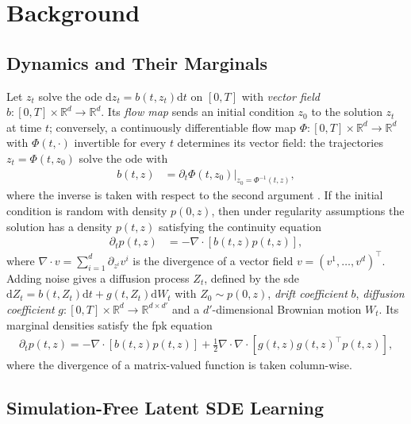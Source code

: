 \documentclass{article} %
\newcommand{\drift}{b}
\newcommand{\vol}{g}
\newcommand{\diff}{{\mathrm{d}}}
\newcommand{\reals}{\mathbb{R}}
\begin{document}
\section{Background}

\subsection{Dynamics and Their Marginals}
Let $z_t$ solve the \gls{ode} $\diff z_t = \drift(t,z_t) \diff t$ on $[0, T]$ with \emph{vector field} $\drift : [0,T] \times \reals^d \to \reals^d$. Its \emph{flow map} sends an initial condition $z_0$ to the solution $z_t$ at time $t$; conversely, a continuously differentiable flow map $\Phi : [0,T] \times \reals^d \to \reals^d$ with $\Phi(t, \cdot)$ invertible for every $t$ determines its vector field: the trajectories $z_t = \Phi(t, z_0)$ solve the \gls{ode} with
\begin{align}
    \drift(t, z) &= \partial_t \Phi(t, z_0) \big|_{z_0 = \Phi^{-1}(t, z)},
    \label{eq:flowvectorfield}
\end{align}
where the inverse is taken with respect to the second argument \citep[Fundamental Theorem on Time-Dependent Flows, Theorem 9.48]{lee2012smooth}. If the initial condition is random with density $p(0, z)$, then under regularity assumptions the solution has a density $p(t, z)$ satisfying the continuity equation
\begin{align}
    \partial_t p(t, z) &= -\nabla \cdot [\drift(t,z) p(t, z)],
    \label{eq:continuity}
\end{align}
where $\nabla \cdot v = \sum_{i=1}^d \partial_{z^i} v^i$ is the divergence of a vector field $v = (v^1, \ldots, v^d)^\top$. Adding noise gives a diffusion process $Z_t$, defined by the \gls{sde} $\diff Z_t = \drift(t,Z_t) \diff t + \vol(t,Z_t)\diff W_t$ with $Z_0 \sim p(0, z)$, \emph{drift coefficient} $\drift$, \emph{diffusion coefficient} $\vol : [0,T] \times \reals^d \to \reals^{d\times d'}$ and a $d'$-dimensional Brownian motion $W_t$. Its marginal densities satisfy the \gls{fpk} equation
\begin{align}
    \partial_t p(t, z) = -\nabla \cdot [\drift(t,z) p(t, z) ] + \frac{1}{2} \nabla \cdot\nabla \cdot[\vol(t,z) \vol(t,z)^\top p(t, z)] ,
    \label{eq:fpk}
\end{align}
where the divergence of a matrix-valued function is taken column-wise.

\subsection{Simulation-Free Latent SDE Learning}
\label{sec:simfree}
\end{document}
